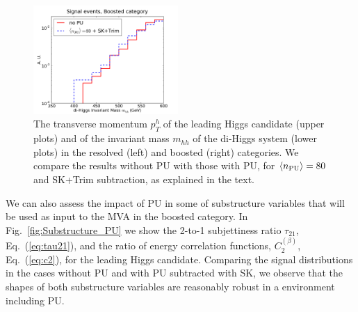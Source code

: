 \begin{figure}[t]
\begin{center}
  \includegraphics[width=0.49\textwidth]{plots/m_HH_C2_bst_comp.pdf}
  \caption{\small
   The
   transverse momentum $p_T^h$ of the leading
    Higgs candidate (upper plots) and of the invariant mass $m_{hh}$
    of the di-Higgs system (lower plots) in the resolved
    (left) and boosted (right) categories.
    We compare the results without PU with those with PU,
    for $\left\langle n_{\rm PU}\right\rangle=80$ and SK+Trim subtraction,
    as explained in the text.
}
\label{fig:mHH_PU}
\end{center}
\end{figure}

We can also assess the impact of PU in some of
substructure variables that will be 
used as input to the MVA in the boosted category.
%
In Fig.~\ref{fig:Substructure_PU} we show the 2-to-1 subjettiness ratio
$\tau_{21}$, Eq.~(\ref{eq:tau21}), and the ratio
of energy correlation functions, $C_2^{(\beta)}$,
Eq.~(\ref{eq:c2}), for the leading Higgs candidate.
%
Comparing the signal distributions in the cases without PU and
with PU subtracted with SK, we observe that
the shapes of both substructure variables
are reasonably robust in a environment including PU.
%

